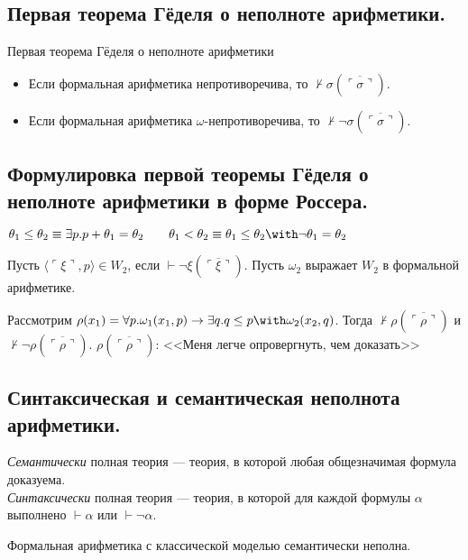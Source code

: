 \documentclass[10pt,a4paper,oneside]{article}
\begin{document}
\subsection{Первая теорема Гёделя о неполноте арифметики.}

 {Первая теорема Гёделя о неполноте арифметики}
\begin{itemize}
\item Если формальная арифметика непротиворечива, то $\not\vdash\sigma(\overline{\ulcorner\sigma\urcorner})$.
\item Если формальная арифметика $\omega$-непротиворечива, то $\not\vdash\neg\sigma(\overline{\ulcorner\sigma\urcorner})$.
\end{itemize}

\subsection{Формулировка первой теоремы Гёделя о неполноте арифметики в форме Россера.}
 $\theta_1\le\theta_2 \equiv \exists p.p+\theta_1=\theta_2\quad\quad\theta_1<\theta_2\equiv\theta_1\le\theta_2\with\neg\theta_1=\theta_2$

 Пусть $\langle \ulcorner\xi\urcorner,p\rangle \in W_2$, если $\vdash\neg\xi(\overline{\ulcorner\xi\urcorner})$.
Пусть $\omega_2$ выражает $W_2$ в формальной арифметике.

 Рассмотрим $\rho(x_1) = \forall p.\omega_1(x_1,p)\rightarrow\exists q.q \le p \with \omega_2(x_2,q)$.
Тогда $\not\vdash\rho(\overline{\ulcorner\rho\urcorner})$ и $\not\vdash\neg\rho(\overline{\ulcorner\rho\urcorner})$.
$\rho(\overline{\ulcorner\rho\urcorner})$: <<Меня легче опровергнуть, чем доказать>>


\subsection{Синтаксическая и семантическая неполнота арифметики.}

 \emph{Семантически} полная теория --- теория, в которой любая общезначимая формула доказуема.\\
\emph{Синтаксически} полная теория --- теория, в которой для каждой формулы $\alpha$ выполнено $\vdash\alpha$ или $\vdash\neg\alpha$.

 Формальная арифметика с классической моделью семантически неполна.
\end{document}
